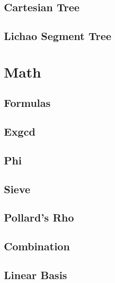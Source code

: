\documentclass[10pt]{article}
\begin{document}
	\subsection{Cartesian Tree}
	
	
	\subsection{Lichao Segment Tree}
	
	
	\section{Math}
	
	\subsection{Formulas}
	

	\subsection{Exgcd}
	
	
	\subsection{Phi}
	
	
	\subsection{Sieve}
	
	
	\subsection{Pollard's Rho}
	
	
	\subsection{Combination}
	
	
	\subsection{Linear Basis}
	
	
\end{document}
